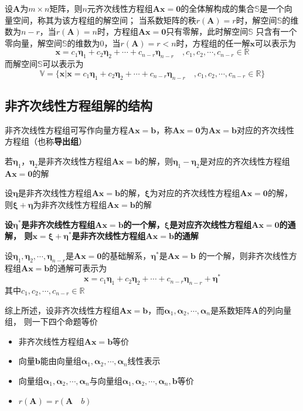 \documentclass[UTF8]{ctexart}
\newcommand{\ve}[1]{{\bm{#1}}}
\newcommand{\mat}[1]{\ve{#1}}
\newcommand{\set}[1]{{\mathbb{#1}}}
\newcommand{\emplin}{\vspace{1em}}
\begin{document}
\emplin
\emplin
\emplin

设$\mat{A}$为$m\times n$矩阵，则$n$元齐次线性方程组$\mat{A}\mat{x}=\mat{0}$的全体解构成的集合$\set{S}$是一个向量空间，称其为该方程组的解空间；
当系数矩阵的秩$r(\mat{A})=r$时，解空间$\set{S}$的维数为$n-r$，当$r(\mat{A})=n$时，方程组$\mat{A}\mat{x}=\mat{0}$只有零解，此时解空间$\set{S}$
只含有一个零向量，解空间$\set{S}$的维数为$0$，当$r(\mat{A})=r<n$时，方程组的任一解$\mat{x}$可以表示为
\[\mat{x}=c_1\mat{\eta}_1+c_2\mat{\eta}_2+\cdots+c_{n-r}\mat{\eta}_{n-r}\quad,c_1,c_2,\cdots,c_{n-r}\in\set{R}\]
而解空间$\set{S}$可以表示为
\[\set{V}=\{ \mat{x}|\mat{x}=c_1\mat{\eta}_1+c_2\mat{\eta}_2+\cdots+c_{n-r}\mat{\eta}_{n-r}\quad,c_1,c_2,\cdots,c_{n-r}\in\set{R} \}\]

\subsection*{非齐次线性方程组解的结构}
非齐次线性方程组可写作向量方程$\mat{A}\mat{x}=\mat{b}$，称$\mat{A}\mat{x}=\mat{0}$为$\mat{A}\mat{x}=\mat{b}$对应的齐次线性方程组（也称\textbf{导出组}）

\emplin
\emplin

若$\mat{\eta}_1$，$\mat{\eta}_2$是非齐次线性方程组$\mat{A}\mat{x}=\mat{b}$的解，则$\mat{\eta}_1-\mat{\eta}_2$是对应的齐次线性方程组$\mat{A}\mat{x}=\mat{0}$的解

\emplin

设$\mat{\eta}$是非齐次线性方程组$\mat{A}\mat{x}=\mat{b}$的解，$\mat{\xi}$为对应的齐次线性方程组$\mat{A}\mat{x}=\mat{0}$的解，
则$\mat{\xi}+\mat{\eta}$为非齐次线性方程组$\mat{A}\mat{x}=\mat{b}$的解

\emplin

\textbf{设$\mat{\eta}^*$是非齐次线性方程组$\mat{A}\mat{x}=\mat{b}$的一个解，$\mat{\xi}$是对应齐次线性方程组$\mat{A}\mat{x}=\mat{0}$的通解，
则$\mat{x}=\mat{\xi}+\mat{\eta}^*$是非齐次线性方程组$\mat{A}\mat{x}=\mat{b}$的通解}

设$\mat{\eta}_1,\mat{\eta}_2,\cdots,\mat{\eta}_{n-r}$是$\mat{A}\mat{x}=\mat{0}$的基础解系，$\mat{\eta}^*$是$\mat{A}\mat{x}=\mat{b}$
的一个解，则非齐次线性方程组$\mat{A}\mat{x}=\mat{b}$的通解可表示为
\[\mat{x}=c_1\mat{\eta}_1+c_2\mat{\eta}_2+\cdots+c_{n-r}\mat{\eta}_{n-r}+\mat{\eta}^*\]
其中$c_1,c_2,\cdots,c_{n-r}\in\set{R}$

\emplin
\emplin

综上所述，设非齐次线性方程组$\mat{A}\mat{x}=\mat{b}$，而$\mat{\alpha}_1,\mat{\alpha}_2,\cdots,\mat{\alpha}_n$是系数矩阵$\mat{A}$的列向量组，
则一下四个命题等价
\begin{itemize}
  \item 非齐次线性方程组$\mat{A}\mat{x}=\mat{b}$等价
  \item 向量$\mat{b}$能由向量组$\mat{\alpha}_1,\mat{\alpha}_2,\cdots,\mat{\alpha}_n$线性表示
  \item 向量组$\mat{\alpha}_1,\mat{\alpha}_2,\cdots,\mat{\alpha}_n$与向量组$\mat{\alpha}_1,\mat{\alpha}_2,\cdots,\mat{\alpha}_n,\mat{b}$等价
  \item $r(\mat{A})=r(\mat{A}\quad b)$
\end{itemize}
\end{document}
